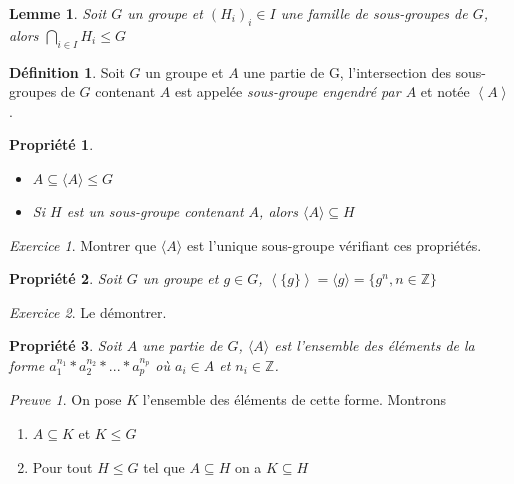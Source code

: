 \documentclass[]{article}
\newtheorem{myproperty}{Propriété}
\newtheorem{mylemma}{Lemme}
\theoremstyle{remark}
\newtheorem{myexer}{Exercice}
\newtheorem{myproof}{Preuve}
\theoremstyle{definition}
\newtheorem{mydef}{Définition}
\begin{document}
\begin{mylemma}
	Soit $G$ un groupe et $\left(H_i\right)_i \in I$ une famille de sous-groupes de $G$, alors $\displaystyle \bigcap_{i \in I}H_i \leqslant G$
\end{mylemma}

\begin{mydef}
	Soit $G$ un groupe et $A$ une partie de G, l'intersection des sous-groupes de $G$ contenant $A$ est appelée \textit{sous-groupe engendré par $A$} et notée $\left\langle A \right\rangle$.
\end{mydef}

\begin{myproperty}
	\leavevmode
	\begin{itemize}
		\item $A \subseteq \langle A \rangle \leqslant G$
		\item Si $H$ est un sous-groupe contenant $A$, alors $\langle A \rangle \subseteq H$
	\end{itemize}
\end{myproperty}

\begin{myexer}
	Montrer que $\langle A \rangle$ est l'unique sous-groupe vérifiant ces propriétés.
\end{myexer}

\begin{myproperty}
	Soit $G$ un groupe et $g \in G$, $\left\langle\{g\}\right\rangle = \langle g \rangle = \{g^n, n \in \mathbb{Z}\}$
\end{myproperty}

\begin{myexer}
	Le démontrer.
\end{myexer}

\begin{myproperty}
	Soit $A$ une partie de $G$, $\langle A \rangle$ est l'ensemble des éléments de la forme $a_1^{n_1}*a_2^{n_2}*...*a_p^{n_p}$ où $a_i \in A$ et $n_i \in \mathbb{Z}$.
\end{myproperty}

\begin{myproof}
	On pose $K$ l'ensemble des éléments de cette forme.
	Montrons
	\begin{enumerate}
		\item $A \subseteq K$ et $K \leqslant G$
		\item Pour tout $H \leqslant G$ tel que $A \subseteq H$ on a $K \subseteq H$
	\end{enumerate}
\end{myproof}
\end{document}
